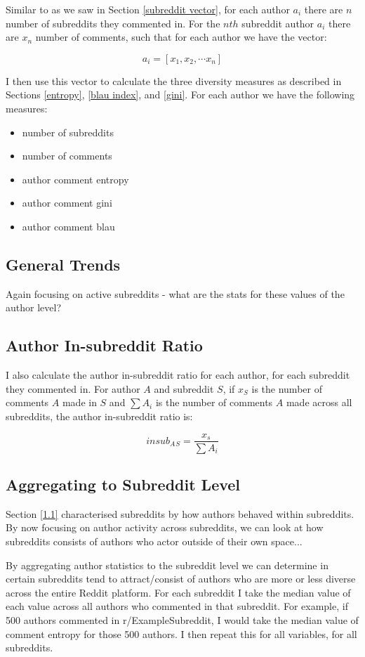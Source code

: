 \documentclass{article}
\begin{document}
Similar to as we saw in Section \ref{subreddit vector}, for each author $a_i$ there are $n$ number of subreddits they commented in. For the $nth$ subreddit author $a_i$ there are $x_n$ number of comments, such that for each author we have the vector:

$$a_i = [x_1, x_2, \cdots x_n]$$

I then use this vector to calculate the three diversity measures as described in Sections \ref{entropy}, \ref{blau index}, and \ref{gini}. For each author we have the following measures:

\begin{itemize}
    \item number of subreddits
    \item number of comments
    \item author comment entropy
    \item author comment gini
    \item author comment blau
\end{itemize}


\subsection{General Trends}
Again focusing on active subreddits - what are the stats for these values of the author level?




\subsection{Author In-subreddit Ratio}
I also calculate the author in-subreddit ratio for each author, for each subreddit they commented in.
For author $A$ and subreddit $S$, if $x_S$ is the number of comments $A$ made in $S$ and $\sum A_i$ is the number of comments $A$ made across all subreddits, the author in-subreddit ratio is:

$$insub_A{}_S = \frac{x_s}{\sum A_i}$$

\subsection{Aggregating to Subreddit Level}
Section \ref{1.1} characterised subreddits by how authors behaved within subreddits. By now focusing on author activity across subreddits, we can look at how subreddits consists of authors who actor outside of their own space...

By aggregating author statistics to the subreddit level we can determine in certain subreddits tend to attract/consist of authors who are more or less diverse across the entire Reddit platform. For each subreddit I take the median value of each value across all authors who commented in that subreddit. For example, if 500 authors commented in r/ExampleSubreddit, I would take the median value of comment entropy for those 500 authors. I then repeat this for all variables, for all subreddits.
\end{document}
